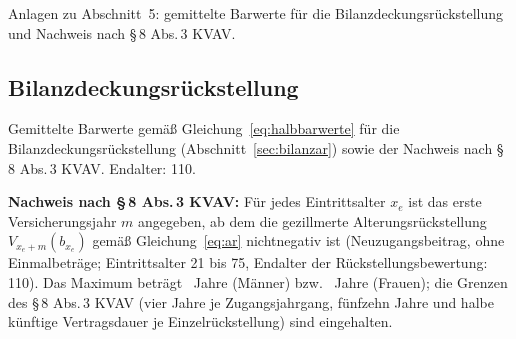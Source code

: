 Anlagen zu Abschnitt~5: gemittelte Barwerte für die
Bilanzdeckungsrückstellung und Nachweis nach \S\,8 Abs.\,3 KVAV.

\setcounter{subsection}{1}
\subsection{Bilanzdeckungsrückstellung}\label{sec:anlage521}

\label{sec:anlage522}%
Gemittelte Barwerte gemäß Gleichung~\eqref{eq:halbbarwerte} für die
Bilanzdeckungsrückstellung (Abschnitt~\ref{sec:bilanzar}) sowie der
Nachweis nach \S\,8 Abs.\,3 KVAV. Endalter: 110.



\clearpage
\textbf{Nachweis nach \S\,8 Abs.\,3 KVAV:} Für jedes Eintrittsalter
$x_e$ ist das erste Versicherungsjahr $m$ angegeben, ab dem die
gezillmerte Alterungsrückstellung $V_{x_e+m}(b_{x_e})$ gemäß
Gleichung~\eqref{eq:ar} nichtnegativ ist (Neuzugangsbeitrag, ohne
Einmalbeträge; Eintrittsalter 21 bis 75, Endalter der
Rückstellungsbewertung: 110). Das Maximum beträgt \MaxNegM~Jahre
(Männer) bzw. \MaxNegF~Jahre (Frauen); die Grenzen des \S\,8 Abs.\,3
KVAV (vier Jahre je Zugangsjahrgang, fünfzehn Jahre und halbe künftige
Vertragsdauer je Einzelrückstellung) sind eingehalten.


